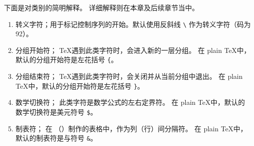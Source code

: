 \documentclass{book}
\begin{document}
下面是对类别的简明解释。
详细解释则在本章及后续章节当中。
\begin{enumerate}
\setcounter{enumi}{-1}
\item\label{ini:esc}
        转义字符；用于标记控制序列的开始。\IniTeX 默认使用反斜线 \verb-\- 作为转义字符（\ascii 码为 92）。
\item{}分组开始符；
        \TeX 遇到此类字符时，会进入新的一层分组。
        在 plain \TeX 中，默认的分组开始符是左花括号 \verb-{-。
\item{}分组结束符；
        \TeX 遇到此类字符时，会关闭并从当前分组中退出。
        在 plain \TeX 中，默认的分组开始符是左花括号 \verb-}-。
\item{}数学切换符；
        此类字符是数学公式的左右定界符。
        在 plain \TeX 中，默认的数学切换符是美元符号 \verb-$-。
\item{}制表符；
        在 （）制作的表格中，作为列（行）间分隔符。
        在 plain \TeX 中，默认的制表符是与符号 \verb-&-。

\end{enumerate}
\end{document}
